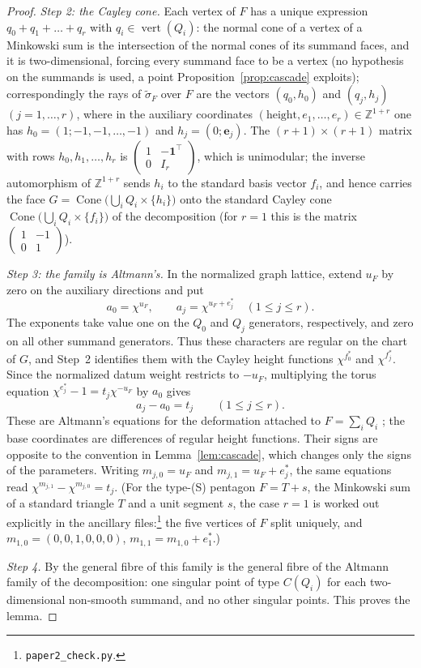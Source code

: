 \documentclass[11pt]{amsart}
\theoremstyle{definition}
\theoremstyle{remark}
\newcommand{\ZZ}{\mathbb{Z}}
\newcommand{\Cone}{\operatorname{Cone}}
\begin{document}
\begin{proof}
\emph{Step 2: the Cayley cone.}  Each vertex of $F$ has a unique
expression $q_0+q_1+\dots+q_r$ with $q_i\in\operatorname{vert}(Q_i)$:
the normal cone of a vertex of a Minkowski sum is the intersection of the
normal cones of its summand faces, and it is two-dimensional, forcing
every summand face to be a vertex (no hypothesis on the summands is
used, a point Proposition~\ref{prop:cascade} exploits); correspondingly the rays of
$\tilde\sigma_F$ over $F$ are the vectors $(q_0, h_0)$ and $(q_j, h_j)$
$(j=1,\dots,r)$, where in the auxiliary coordinates
$(\text{height}, e_1,\dots,e_r)\in\ZZ^{1+r}$ one has
$h_0 = (1;-1,-1,\dots,-1)$ and $h_j = (0; \mathbf e_j)$.  The
$(r{+}1)\times(r{+}1)$ matrix with rows $h_0,h_1,\dots,h_r$ is
$\left(\begin{smallmatrix} 1 & -\mathbf 1^{\!\top}\\ 0 & I_r\end{smallmatrix}\right)$,
which is unimodular; the inverse automorphism of $\ZZ^{1+r}$ sends
$h_i$ to the standard basis vector $f_i$, and hence carries the face
$G = \Cone\bigl(\bigcup_i Q_i\times\{h_i\}\bigr)$ onto the standard
Cayley cone $\Cone\bigl(\bigcup_i Q_i\times\{f_i\}\bigr)$ of the
decomposition (for $r=1$ this is the matrix
$\left(\begin{smallmatrix}1&-1\\0&1\end{smallmatrix}\right)$).

\emph{Step 3: the family is Altmann's.}  In the normalized graph
lattice, extend $u_F$ by zero on the auxiliary directions and put
\[
 a_0=\chi^{u_F},\qquad a_j=\chi^{u_F+e_j^\ast}
 \quad(1\le j\le r).
\]
The exponents take value one on the $Q_0$ and $Q_j$ generators,
respectively, and zero on all other summand generators.  Thus these
characters are regular on the chart of $G$, and Step~2 identifies them
with the Cayley height functions $\chi^{f_0^\ast}$ and
$\chi^{f_j^\ast}$.  Since the normalized datum weight restricts to
$-u_F$, multiplying the torus equation
$\chi^{e_j^\ast}-1=t_j\chi^{-u_F}$ by $a_0$ gives
\[
 a_j-a_0=t_j \qquad(1\le j\le r).
\]
These are Altmann's equations for the deformation attached to
$F=\sum_iQ_i$ \cite{Altmann95}; the base coordinates are differences of
regular height functions.  Their signs are opposite to the convention
in Lemma~\ref{lem:cascade}, which changes only the signs of the
parameters.  Writing $m_{j,0}=u_F$ and $m_{j,1}=u_F+e_j^\ast$, the
same equations read $\chi^{m_{j,1}}-\chi^{m_{j,0}}=t_j$.  (For the type-\textup{(S)} pentagon
$F = T + s$, the Minkowski sum of a standard triangle $T$ and a unit
segment $s$, the case $r = 1$ is worked out explicitly in the ancillary
files:\footnote{\texttt{paper2\_check.py}.} the five vertices of
$F$ split uniquely, and $m_{1,0} = (0,0,1,0,0,0)$,
$m_{1,1} = m_{1,0} + e_1^\ast$.)

\emph{Step 4.}  By \cite[Lemma~2.4]{paper1} the general fibre of this
family is the general fibre of the Altmann family of the decomposition:
one singular point of
type $C(Q_i)$ for each two-dimensional non-smooth summand, and no other
singular points.  This proves the lemma.
\end{proof}
\end{document}
